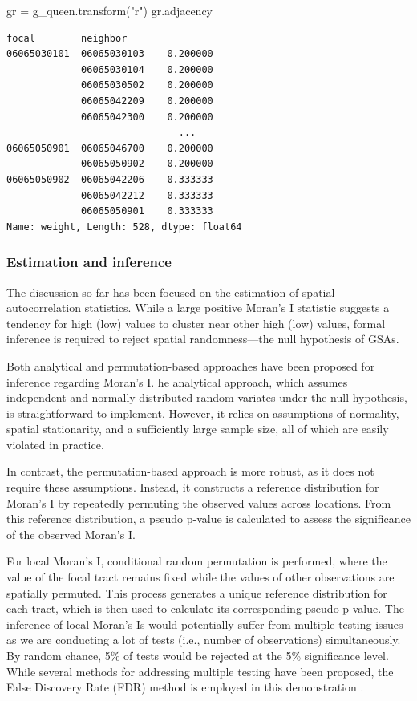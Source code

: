 \documentclass[
]{aft}
\newenvironment{Shaded}{\begin{snugshade}}{\end{snugshade}}
\newcommand{\NormalTok}[1]{\textcolor[rgb]{0.00,0.23,0.31}{#1}}
\newcommand{\OperatorTok}[1]{\textcolor[rgb]{0.37,0.37,0.37}{#1}}
\newcommand{\StringTok}[1]{\textcolor[rgb]{0.13,0.47,0.30}{#1}}
\begin{document}
\begin{Shaded}
\begin{Highlighting}[]
\NormalTok{gr }\OperatorTok{=}\NormalTok{ g\_queen.transform(}\StringTok{"r"}\NormalTok{)}
\NormalTok{gr.adjacency}
\end{Highlighting}
\end{Shaded}

\begin{verbatim}
focal        neighbor   
06065030101  06065030103    0.200000
             06065030104    0.200000
             06065030502    0.200000
             06065042209    0.200000
             06065042300    0.200000
                              ...   
06065050901  06065046700    0.200000
             06065050902    0.200000
06065050902  06065042206    0.333333
             06065042212    0.333333
             06065050901    0.333333
Name: weight, Length: 528, dtype: float64
\end{verbatim}

\subsubsection{Estimation and inference}\label{estimation-and-inference}

The discussion so far has been focused on the estimation of spatial
autocorrelation statistics. While a large positive Moran's I statistic
suggests a tendency for high (low) values to cluster near other high
(low) values, formal inference is required to reject spatial
randomness---the null hypothesis of GSAs.

Both analytical and permutation-based approaches have been proposed for
inference regarding Moran's I. he analytical approach, which assumes
independent and normally distributed random variates under the null
hypothesis, is straightforward to implement. However, it relies on
assumptions of normality, spatial stationarity, and a sufficiently large
sample size, all of which are easily violated in practice.

In contrast, the permutation-based approach is more robust, as it does
not require these assumptions. Instead, it constructs a reference
distribution for Moran's I by repeatedly permuting the observed values
across locations. From this reference distribution, a pseudo p-value is
calculated to assess the significance of the observed Moran's I.

For local Moran's I, conditional random permutation is performed, where
the value of the focal tract remains fixed while the values of other
observations are spatially permuted. This process generates a unique
reference distribution for each tract, which is then used to calculate
its corresponding pseudo p-value. The inference of local Moran's Is
would potentially suffer from multiple testing issues as we are
conducting a lot of tests (i.e., number of observations) simultaneously.
By random chance, 5\% of tests would be rejected at the 5\% significance
level. While several methods for addressing multiple testing have been
proposed, the False Discovery Rate (FDR) method is employed in this
demonstration \citep{Benjamini2001, Castro:2006tz}.
\end{document}

